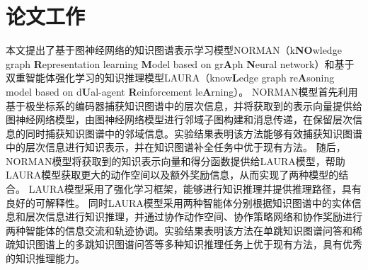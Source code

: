 \documentclass[algorithmlist, AutoFakeBold, AutoFakeSlant, figurelist, tablelist, nomlist, engineering]{seuthesix}
\begin{document}
\section{论文工作}
本文提出了基于图神经网络的知识图谱表示学习模型NORMAN（k\textbf{NO}wledge graph \textbf{R}epresentation learning \textbf{M}odel based on gr\textbf{A}ph \textbf{N}eural network）和基于双重智能体强化学习的知识推理模型LAURA（know\textbf{L}edge graph re\textbf{A}soning model based on d\textbf{U}al-agent \textbf{R}einforcement le\textbf{A}rning）。
NORMAN模型首先利用基于极坐标系的编码器捕获知识图谱中的层次信息，并将获取到的表示向量提供给图神经网络模型，由图神经网络模型进行邻域子图构建和消息传递，在保留层次信息的同时捕获知识图谱中的邻域信息。实验结果表明该方法能够有效捕获知识图谱中的层次信息进行知识表示，并在知识图谱补全任务中优于现有方法。
随后，NORMAN模型将获取到的知识表示向量和得分函数提供给LAURA模型，帮助LAURA模型获取更大的动作空间以及额外奖励信息，从而实现了两种模型的结合。
LAURA模型采用了强化学习框架，能够进行知识推理并提供推理路径，具有良好的可解释性。
同时LAURA模型采用两种智能体分别根据知识图谱中的实体信息和层次信息进行知识推理，并通过协作动作空间、协作策略网络和协作奖励进行两种智能体的信息交流和轨迹协调。实验结果表明该方法在单跳知识图谱问答和稀疏知识图谱上的多跳知识图谱问答等多种知识推理任务上优于现有方法，具有优秀的知识推理能力。
\end{document}
